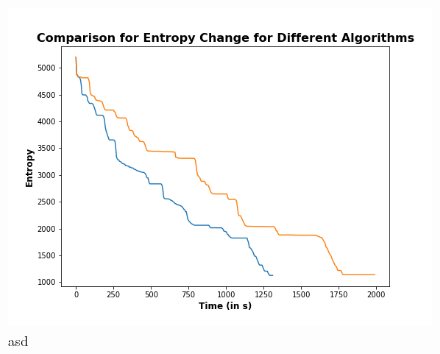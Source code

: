 \documentclass[a4paper,12pt]{article}
\begin{document}
			\begin{figure}[H]
				\centering
				\includegraphics[scale=0.5]{images/EntropyChange.png}
				\caption{asd}
				\label{EntropyChange}
			\end{figure}

	
	\newpage
	
	
	\newpage
	\appendix
	\appendixpage
	\addappheadtotoc
	
\end{document}
